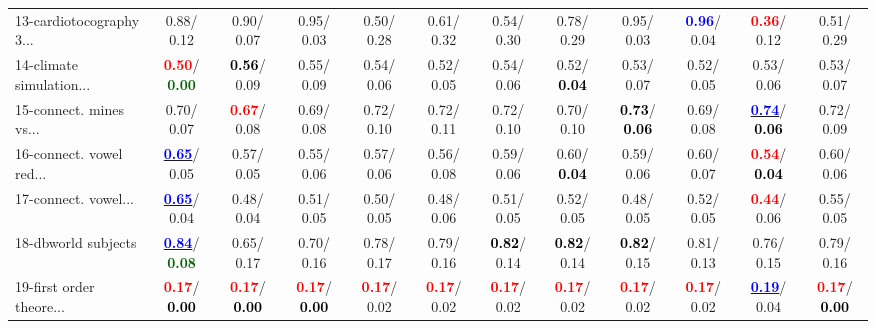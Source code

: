 \begin{table}[h]
\begin{center}
{\begin{tabular}{lc|c|c|c|c|c|c|c|c|c|c}
13-cardiotocography 3... &   0.88/  0.12 &   0.90/  0.07 &   0.95/  0.03 &   0.50/  0.28 &   0.61/  0.32 &   0.54/  0.30 &   0.78/  0.29 &   0.95/  0.03 & \textcolor{blue}{\textbf{  0.96}}/  0.04 & \textcolor{red}{\textbf{  0.36}}/  0.12 &   0.51/  0.29 \\
14-climate simulation... & \textcolor{red}{\textbf{  0.50}}/\textcolor{darkgreen}{\textbf{  0.00}} & \textcolor{black}{\textbf{  0.56}}/  0.09 &   0.55/  0.09 &   0.54/  0.06 &   0.52/  0.05 &   0.54/  0.06 &   0.52/\textcolor{black}{\textbf{  0.04}} &   0.53/  0.07 &   0.52/  0.05 &   0.53/  0.06 &   0.53/  0.07 \\ \hline
15-connect. mines vs... &   0.70/  0.07 & \textcolor{red}{\textbf{  0.67}}/  0.08 &   0.69/  0.08 &   0.72/  0.10 &   0.72/  0.11 &   0.72/  0.10 &   0.70/  0.10 & \textcolor{black}{\textbf{  0.73}}/\textcolor{black}{\textbf{  0.06}} &   0.69/  0.08 & \underline{\textcolor{blue}{\textbf{  0.74}}}/\textcolor{black}{\textbf{  0.06}} &   0.72/  0.09 \\
16-connect. vowel red... & \underline{\textcolor{blue}{\textbf{  0.65}}}/  0.05 &   0.57/  0.05 &   0.55/  0.06 &   0.57/  0.06 &   0.56/  0.08 &   0.59/  0.06 &   0.60/\textcolor{black}{\textbf{  0.04}} &   0.59/  0.06 &   0.60/  0.07 & \textcolor{red}{\textbf{  0.54}}/\textcolor{black}{\textbf{  0.04}} &   0.60/  0.06 \\
17-connect. vowel... & \underline{\textcolor{blue}{\textbf{  0.65}}}/  0.04 &   0.48/  0.04 &   0.51/  0.05 &   0.50/  0.05 &   0.48/  0.06 &   0.51/  0.05 &   0.52/  0.05 &   0.48/  0.05 &   0.52/  0.05 & \textcolor{red}{\textbf{  0.44}}/  0.06 &   0.55/  0.05 \\
18-dbworld subjects & \underline{\textcolor{blue}{\textbf{  0.84}}}/\textcolor{darkgreen}{\textbf{  0.08}} &   0.65/  0.17 &   0.70/  0.16 &   0.78/  0.17 &   0.79/  0.16 & \textcolor{black}{\textbf{  0.82}}/  0.14 & \textcolor{black}{\textbf{  0.82}}/  0.14 & \textcolor{black}{\textbf{  0.82}}/  0.15 &   0.81/  0.13 &   0.76/  0.15 &   0.79/  0.16 \\
19-first order theore... & \textcolor{red}{\textbf{  0.17}}/\textcolor{black}{\textbf{  0.00}} & \textcolor{red}{\textbf{  0.17}}/\textcolor{black}{\textbf{  0.00}} & \textcolor{red}{\textbf{  0.17}}/\textcolor{black}{\textbf{  0.00}} & \textcolor{red}{\textbf{  0.17}}/  0.02 & \textcolor{red}{\textbf{  0.17}}/  0.02 & \textcolor{red}{\textbf{  0.17}}/  0.02 & \textcolor{red}{\textbf{  0.17}}/  0.02 & \textcolor{red}{\textbf{  0.17}}/  0.02 & \textcolor{red}{\textbf{  0.17}}/  0.02 & \underline{\textcolor{blue}{\textbf{  0.19}}}/  0.04 & \textcolor{red}{\textbf{  0.17}}/\textcolor{black}{\textbf{  0.00}} \\

\end{tabular}}
\end{center}
\end{table}
